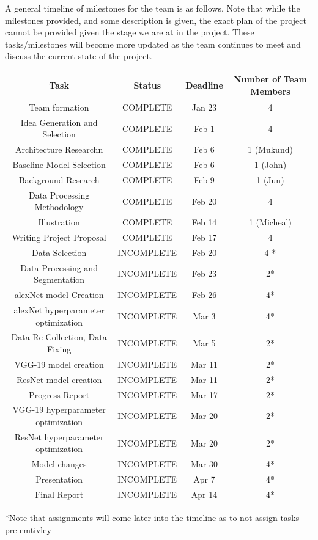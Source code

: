 \documentclass{article} %
\begin{document}
A general timeline of milestones for the team is as follows. Note that while the milestones provided, and some description is given, the exact plan of the project cannot be provided given the stage we are at in the project. These tasks/milestones will become more updated as the team continues to meet and discuss the current state of the project.
\begin{center}
\begin{tabular}{||c c c c||} 
 \hline
 Task & Status & Deadline & Number of Team Members \\ [0.5ex] 
 \hline\hline
 Team formation & COMPLETE & Jan 23 & 4 \\ 
 \hline
 Idea Generation and Selection & COMPLETE & Feb 1 & 4 \\
 \hline
 Architecture Researchn & COMPLETE & Feb 6 & 1 (Mukund) \\
 \hline
 Baseline Model Selection & COMPLETE & Feb 6 & 1 (John) \\
 \hline
 Background Research & COMPLETE & Feb 9 & 1 (Jun) \\ 
 \hline
 Data Processing Methodology & COMPLETE & Feb 20 & 4 \\
 \hline
 Illustration & COMPLETE & Feb 14 & 1 (Micheal) \\
 \hline
 Writing Project Proposal & COMPLETE & Feb 17 & 4 \\
 \hline
 Data Selection & INCOMPLETE & Feb 20 & 4 *\\
 \hline
 Data Processing and Segmentation & INCOMPLETE & Feb 23 & 2* \\
 \hline
 alexNet model Creation & INCOMPLETE & Feb 26 & 4* \\
 \hline
 alexNet hyperparameter optimization & INCOMPLETE & Mar 3 & 4* \\
 \hline
 Data Re-Collection, Data Fixing & INCOMPLETE & Mar 5 & 2* \\
 \hline
 VGG-19 model creation & INCOMPLETE & Mar 11 & 2* \\
 \hline
 ResNet model creation & INCOMPLETE & Mar 11 & 2* \\
 \hline
 Progress Report & INCOMPLETE & Mar 17 & 2* \\
 \hline
 VGG-19 hyperparameter optimization & INCOMPLETE & Mar 20 & 2* \\
 \hline
 ResNet  hyperparameter optimization & INCOMPLETE & Mar 20 & 2* \\
 \hline
 Model changes  & INCOMPLETE & Mar 30 & 4* \\
\hline
 Presentation  & INCOMPLETE & Apr 7 & 4* \\
\hline
 Final Report  & INCOMPLETE & Apr 14 & 4* \\
\hline
\end{tabular}
\end{center}
*Note that assignments will come later into the timeline as to not assign tasks pre-emtivley
\end{document}
